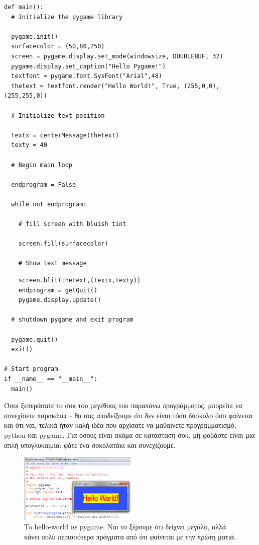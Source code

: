 \begin{verbatim}
def main():
  # Initialize the pygame library

  pygame.init()
  surfacecolor = (50,80,250)
  screen = pygame.display.set_mode(windowsize, DOUBLEBUF, 32)
  pygame.display.set_caption("Hello Pygame!")
  textfont = pygame.font.SysFont("Arial",48)
  thetext = textfont.render("Hello World!", True, (255,0,0),(255,255,0))

  # Initialize text position

  textx = centerMessage(thetext)
  texty = 40

  # Begin main loop

  endprogram = False

  while not endprogram:

    # fill screen with bluish tint

    screen.fill(surfacecolor)

    # Show text message
\end{verbatim}

\begin{verbatim}
    screen.blit(thetext,(textx,texty))
    endprogram = getQuit()
    pygame.display.update()

  # shutdown pygame and exit program

  pygame.quit()
  exit()

# Start program
if __name__ == "__main__":
  main()
\end{verbatim}

Όσοι ξεπεράσατε το σοκ του μεγέθους του παραπάνω προγράμματος, μπορείτε να συνεχίσετε παρακάτω -- θα σας αποδείξουμε ότι δεν είναι τόσο δύσκολο όσο φαίνεται και ότι ναι, τελικά ήταν καλή ιδέα που αρχίσατε να μαθαίνετε προγραμματισμό, python και pygame. Για όσους είναι ακόμα σε κατάσταση σοκ, μη φοβάστε είναι μια απλή υπογλυκαιμία: φάτε ένα σοκολατάκι και συνεχίζουμε.

\begin{figure}
  \centering
  \includegraphics[width=0.5\textwidth]{images/chapter4/hello}
  \caption[Hello World σε Pygame]{To hello-world σε pygame. Ναι το ξέρουμε ότι δείχνει μεγάλο, αλλά κάνει πολύ περισσότερα πράγματα από ότι φαίνεται με την πρώτη ματιά.}
  \label{4-2}
\end{figure}

